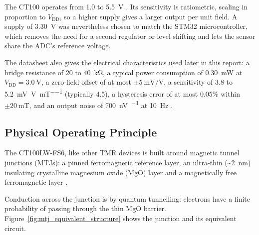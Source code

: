 \documentclass[12pt,a4paper]{article}
\begin{document}
The CT100 operates from 1.0 to \SI{5.5}{\volt} \cite{ct100_datasheet}. Its sensitivity is ratiometric, scaling in proportion to $V_{\text{DD}}$, so a higher supply gives a larger output per unit field. A supply of \SI{3.30}{\volt} was nevertheless chosen to match the STM32 microcontroller, which removes the need for a second regulator or level shifting and lets the sensor share the ADC's reference voltage.

The datasheet also gives the electrical characteristics used later in this report: a bridge resistance of 20 to \SI{40}{\kilo\ohm}, a typical power consumption of \SI{0.30}{\milli\watt} at $V_{\text{DD}} = \SI{3.0}{\volt}$, a zero-field offset of at most $\pm\SI{5}{\milli\volt\per\volt}$, a sensitivity of 3.8 to \SI{5.2}{\milli\volt\per\volt\per\milli\tesla} (typically 4.5), a hysteresis error of at most 0.05\% within $\pm\SI{20}{\milli\tesla}$, and an output noise of \SI{700}{\nano\volt\per\sqrt{\hertz}} at \SI{10}{\hertz} \cite{ct100_datasheet}.

\subsection{Physical Operating Principle}
\label{sec:ct100-principle}

The CT100LW-FS6, like other TMR devices is built around magnetic tunnel junctions (MTJs): a pinned ferromagnetic reference layer, an ultra-thin (\textasciitilde\SI{2}{\nano\metre}) insulating crystalline magnesium oxide (MgO) layer and a magnetically free ferromagnetic layer \cite{parkin2004,yuasa2004}. 

Conduction across the junction is by quantum tunnelling: electrons have a finite probability of passing through the thin MgO barrier. Figure~\ref{fig:mtj_equivalent_structure} shows the junction and its equivalent circuit.
\end{document}
